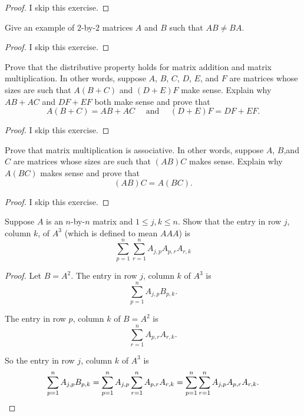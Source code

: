 \begin{proof}
    I skip this exercise.
\end{proof}
\newpage

\begin{exercise}
    Give an example of $2$-by-$2$ matrices $A$ and $B$ such that $AB \ne BA$.
\end{exercise}

\begin{proof}
    I skip this exercise.
\end{proof}
\newpage

\begin{exercise}
    Prove that the distributive property holds for matrix addition and matrix multiplication. In other words, suppose $A$, $B$, $C$, $D$, $E$, and $F$ are matrices whose sizes are such that $A(B + C)$ and $(D + E)F$ make sense. Explain why $AB + AC$ and $DF + EF$ both make sense and prove that
    \[
        A(B + C) = AB + AC \quad\text{ and }\quad (D + E)F = DF + EF.
    \]
\end{exercise}

\begin{proof}
    I skip this exercise.
\end{proof}
\newpage

\begin{exercise}
    Prove that matrix multiplication is associative. In other words, suppose $A$, $B$,and $C$ are matrices whose sizes are such that $(AB)C$ makes sense. Explain why $A(BC)$ makes sense and prove that
    \[
        (AB)C = A(BC).
    \]
\end{exercise}

\begin{proof}
    I skip this exercise.
\end{proof}
\newpage

\begin{exercise}
    Suppose $A$ is an $n$-by-$n$ matrix and $1\leq j, k\leq n$. Show that the entry in row $j$, column $k$, of $A^{3}$ (which is defined to mean $AAA$) is
    \[
        \sum^{n}_{p=1}\sum^{n}_{r=1}A_{j,p}A_{p,r}A_{r,k}
    \]
\end{exercise}

\begin{proof}
    Let $B = A^{2}$. The entry in row $j$, column $k$ of $A^{3}$ is
    \[
        \sum^{n}_{p=1}A_{j,p}B_{p,k}.
    \]

    The entry in row $p$, column $k$ of $B = A^{2}$ is
    \[
        \sum^{n}_{r=1}A_{p,r}A_{r,k}.
    \]

    So the entry in row $j$, column $k$ of $A^{3}$ is
    \[
        \sum^{n}_{p=1}A_{j,p}B_{p,k} = \sum^{n}_{p=1}A_{j,p}\sum^{n}_{r=1}A_{p,r}A_{r,k} = \sum^{n}_{p=1}\sum^{n}_{r=1}A_{j,p}A_{p,r}A_{r,k}.\qedhere
    \]
\end{proof}
\newpage

